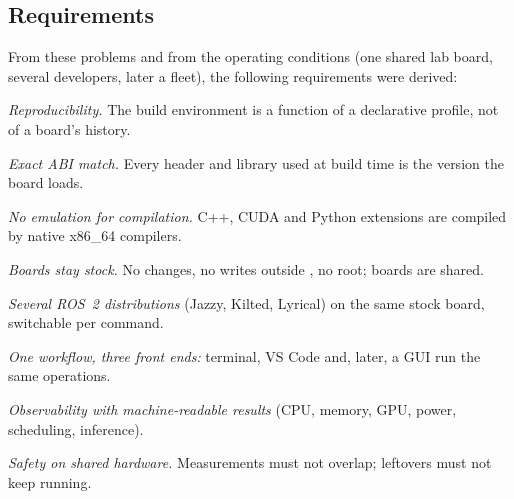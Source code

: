 \documentclass[11pt,a4paper]{article}
\begin{document}
\subsection{Requirements}
From these problems and from the operating conditions (one shared lab board, several developers, later a fleet),
the following requirements were derived:
\begin{description}[leftmargin=1.1cm, labelindent=0pt, style=sameline, itemsep=0pt]
  \item[R1] \emph{Reproducibility.} The build environment is a function of a declarative profile, not of a board's history.
  \item[R2] \emph{Exact ABI match.} Every header and library used at build time is the version the board loads.
  \item[R3] \emph{No emulation for compilation.} C++, CUDA and Python extensions are compiled by native x86\_64 compilers.
  \item[R4] \emph{Boards stay stock.} No  changes, no writes outside , no root; boards are shared.
  \item[R5] \emph{Several ROS~2 distributions} (Jazzy, Kilted, Lyrical) on the same stock board, switchable per command.
  \item[R6] \emph{One workflow, three front ends:} terminal, VS Code and, later, a GUI run the same operations.
  \item[R7] \emph{Observability with machine-readable results} (CPU, memory, GPU, power, scheduling, inference).
  \item[R8] \emph{Safety on shared hardware.} Measurements must not overlap; leftovers must not keep running.
\end{description}
\end{document}
